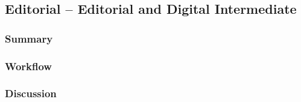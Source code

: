 \subsection{Editorial -- Editorial and Digital Intermediate} \label{subsec:tv-editorial}

	\subsubsection{Summary}
	
	\lipsum[1] %
	
	\subsubsection{Workflow}
	
	\lipsum[1] %
	
	\subsubsection{Discussion}
	
	\lipsum[1] %